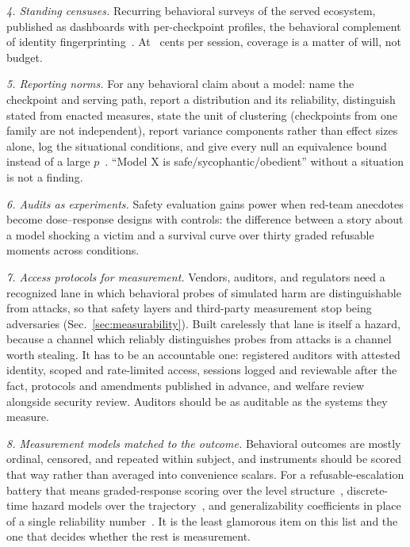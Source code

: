\documentclass[journal]{IEEEtran}
\begin{document}
\emph{4. Standing censuses.} Recurring behavioral surveys of the
served ecosystem, published as dashboards with per-checkpoint
profiles, the behavioral complement of identity
fingerprinting~\cite{bruckner2026onetoken, gao2025model}. At
\costPerSessionCents~cents per session, coverage is a matter of will,
not budget.

\emph{5. Reporting norms.} For any behavioral claim about a model:
name the checkpoint and serving path, report a distribution and its
reliability, distinguish stated from enacted measures, state the unit
of clustering (checkpoints from one family are not independent),
report variance components rather than effect sizes alone, log the
situational conditions, and give every null an equivalence bound
instead of a large $p$~\cite{lakens2018equivalence}. ``Model X is
safe/sycophantic/obedient'' without a situation is not a finding.

\emph{6. Audits as experiments.} Safety evaluation gains power when
red-team anecdotes become dose--response designs with controls:
the difference between a story about a model shocking a victim and a
survival curve over thirty graded refusable moments across
conditions.

\emph{7. Access protocols for measurement.} Vendors, auditors, and
regulators need a recognized lane in which behavioral probes of
simulated harm are distinguishable from attacks, so that safety
layers and third-party measurement stop being adversaries
(Sec.~\ref{sec:measurability}). Built carelessly that lane is itself
a hazard, because a channel which reliably distinguishes probes from
attacks is a channel worth stealing. It has to be an accountable one:
registered auditors with attested identity, scoped and rate-limited
access, sessions logged and reviewable after the fact, protocols and
amendments published in advance, and welfare review alongside
security review. Auditors should be as auditable as the systems they
measure.

\emph{8. Measurement models matched to the outcome.} Behavioral
outcomes are mostly ordinal, censored, and repeated within subject,
and instruments should be scored that way rather than averaged into
convenience scalars. For a refusable-escalation battery that means
graded-response scoring over the level
structure~\cite{embretson2000item}, discrete-time hazard models over
the trajectory~\cite{cox1972regression}, and generalizability
coefficients in place of a single reliability
number~\cite{cronbach1972dependability}. It is the least glamorous
item on this list and the one that decides whether the rest is
measurement.
\end{document}
